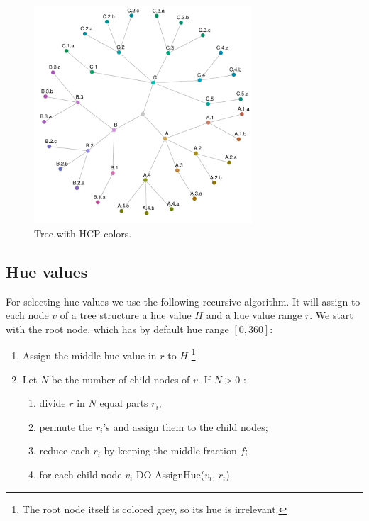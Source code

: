 \documentclass[journal]{vgtc}                %
\begin{document}
\begin{figure}[htb]
  \vspace{-3ex}
  \centering
  \includegraphics[width=3.2in]{HCPgraph.pdf}
  \vspace{-5ex}
  \caption{Tree with HCP colors.}\label{fig:graph}
  \vspace{-2ex}
\end{figure}

\subsection{Hue values}

For selecting hue values we use the following recursive algorithm. It will assign to each node $v$ of a tree structure a hue value $H$ and a hue value range $r$.
We start with the root node, which has by default hue range $[0, 360]$:

\vspace{-1mm}\begin{enumerate} \itemsep1pt \parskip0pt 
\item Assign the middle hue value in $r$ to $H$ \footnote{The root node itself is colored grey, so its hue is irrelevant.}.
\item Let $N$ be the number of child nodes of $v$. If $N>0$ :
\begin{enumerate}[i] \itemsep1pt \parskip0pt 
\item divide $r$ in $N$ equal parts $r_i$;
\item permute the $r_i$'s and assign them to the child nodes;
\item reduce each $r_i$ by keeping the middle fraction $f$;
\item for each child node $v_i$ DO AssignHue($v_i$, $r_i$).
\end{enumerate}
\end{enumerate}
\end{document}
